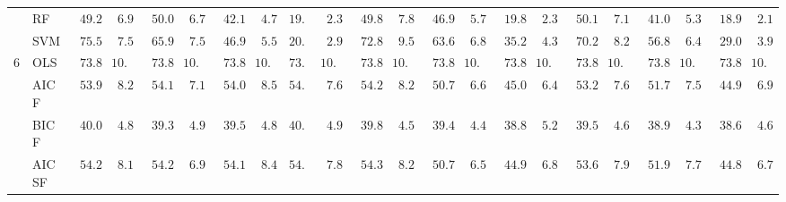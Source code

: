 \begin{tabular}{p{0.2cm}p{1cm}|p{0.6cm}p{0.6cm}|p{0.6cm}p{0.6cm}p{0.6cm}p{0.6cm}p{0.6cm}p{0.6cm}|p{0.6cm}p{0.6cm}p{0.6cm}p{0.6cm}p{0.6cm}p{0.6cm}|p{0.6cm}p{0.6cm}p{0.6cm}p{0.6cm}p{0.6cm}p{0.6cm}}
 & RF  & $\phantom{0}49.29$ & $\phantom{0}6.97$ & $\phantom{0}50.03$ & $\phantom{0}6.71$ & $\phantom{0}42.19$ & $\phantom{0}4.73$ & $19.64$ & $\phantom{0}2.36$ & $\phantom{0}49.84$ & $\phantom{0}7.85$ & $\phantom{0}46.91$ & $\phantom{0}5.75$ & $\phantom{0}19.85$ & $\phantom{0}2.37$ & $\phantom{0}50.11$ & $\phantom{0}7.19$ & $\phantom{0}41.09$ & $\phantom{0}5.37$ & $\phantom{0}18.97$ & $\phantom{0}2.13$ \\
 & SVM  & $\phantom{0}75.55$ & $\phantom{0}7.59$ & $\phantom{0}65.95$ & $\phantom{0}7.59$ & $\phantom{0}46.92$ & $\phantom{0}5.58$ & $20.73$ & $\phantom{0}2.96$ & $\phantom{0}72.85$ & $\phantom{0}9.51$ & $\phantom{0}63.65$ & $\phantom{0}6.84$ & $\phantom{0}35.29$ & $\phantom{0}4.32$ & $\phantom{0}70.26$ & $\phantom{0}8.28$ & $\phantom{0}56.81$ & $\phantom{0}6.45$ & $\phantom{0}29.01$ & $\phantom{0}3.91$ \\\hline
6 & OLS  & $\phantom{0}73.85$ & $10.20$ & $\phantom{0}73.85$ & $10.20$ & $\phantom{0}73.85$ & $10.20$ & $73.85$ & $10.20$ & $\phantom{0}73.85$ & $10.20$ & $\phantom{0}73.85$ & $10.20$ & $\phantom{0}73.85$ & $10.20$ & $\phantom{0}73.85$ & $10.20$ & $\phantom{0}73.85$ & $10.20$ & $\phantom{0}73.85$ & $10.20$ \\
 & AIC F  & $\phantom{0}53.93$ & $\phantom{0}8.26$ & $\phantom{0}54.10$ & $\phantom{0}7.14$ & $\phantom{0}54.00$ & $\phantom{0}8.55$ & $54.05$ & $\phantom{0}7.68$ & $\phantom{0}54.24$ & $\phantom{0}8.23$ & $\phantom{0}50.77$ & $\phantom{0}6.60$ & $\phantom{0}45.04$ & $\phantom{0}6.44$ & $\phantom{0}53.27$ & $\phantom{0}7.61$ & $\phantom{0}51.78$ & $\phantom{0}7.59$ & $\phantom{0}44.91$ & $\phantom{0}6.99$ \\
 & BIC F  & $\phantom{0}40.05$ & $\phantom{0}4.89$ & $\phantom{0}39.37$ & $\phantom{0}4.98$ & $\phantom{0}39.53$ & $\phantom{0}4.85$ & $40.29$ & $\phantom{0}4.97$ & $\phantom{0}39.88$ & $\phantom{0}4.51$ & $\phantom{0}39.43$ & $\phantom{0}4.40$ & $\phantom{0}38.86$ & $\phantom{0}5.28$ & $\phantom{0}39.50$ & $\phantom{0}4.64$ & $\phantom{0}38.95$ & $\phantom{0}4.39$ & $\phantom{0}38.68$ & $\phantom{0}4.60$ \\
 & AIC SF  & $\phantom{0}54.26$ & $\phantom{0}8.17$ & $\phantom{0}54.23$ & $\phantom{0}6.93$ & $\phantom{0}54.14$ & $\phantom{0}8.43$ & $54.21$ & $\phantom{0}7.84$ & $\phantom{0}54.36$ & $\phantom{0}8.24$ & $\phantom{0}50.72$ & $\phantom{0}6.57$ & $\phantom{0}44.99$ & $\phantom{0}6.80$ & $\phantom{0}53.61$ & $\phantom{0}7.93$ & $\phantom{0}51.99$ & $\phantom{0}7.73$ & $\phantom{0}44.80$ & $\phantom{0}6.75$ \\

\end{tabular}
